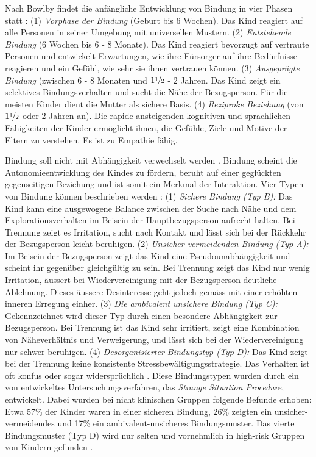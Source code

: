 Nach Bowlby findet die anfängliche Entwicklung von Bindung in vier Phasen statt \cite{Siegler2008}: (1) \textit{Vorphase der Bindung} (Geburt bis 6 Wochen). Das Kind reagiert auf alle Personen in seiner Umgebung mit universellen Mustern. (2) \textit{Entstehende Bindung} (6 Wochen bis 6 - 8 Monate). Das Kind reagiert bevorzugt auf vertraute Personen und entwickelt Erwartungen, wie ihre Fürsorger auf ihre Bedürfnisse reagieren und ein Gefühl, wie sehr sie ihnen vertrauen können. (3) \textit{Ausgeprägte Bindung} (zwischen 6 - 8 Monaten und $1\nicefrac{1}{2}$ - 2 Jahren. Das Kind zeigt ein selektives Bindungsverhalten und sucht die Nähe der Bezugsperson. Für die meisten Kinder dient die Mutter als sichere Basis. (4) \textit{Reziproke Beziehung} (von $1\nicefrac{1}{2}$ oder 2 Jahren an). Die rapide ansteigenden kognitiven und sprachlichen Fähigkeiten der Kinder ermöglicht ihnen, die Gefühle, Ziele und Motive der Eltern zu verstehen. Es ist zu Empathie fähig.

Bindung soll nicht mit Abhängigkeit verwechselt werden \cite{Schmidt1996}. Bindung scheint die Autonomieentwicklung des Kindes zu fördern, beruht auf einer geglückten gegenseitigen Beziehung und ist somit ein Merkmal der Interaktion. Vier Typen von Bindung können beschrieben werden \cite{Resch1999}: (1) \textit{Sichere Bindung (Typ B):} Das Kind kann eine ausgewogene Balance zwischen der Suche nach Nähe und dem Explorationsverhalten im Beisein der Hauptbezugsperson aufrecht halten. Bei Trennung zeigt es Irritation, sucht nach Kontakt und lässt sich bei der Rückkehr der Bezugsperson leicht beruhigen. (2) \textit{Unsicher vermeidenden Bindung (Typ A):} Im Beisein der Bezugsperson zeigt das Kind eine Pseudounabhängigkeit und scheint ihr gegenüber gleichgültig zu sein. Bei Trennung zeigt das Kind nur wenig Irritation, äussert bei Wiedervereinigung mit der Bezugsperson deutliche Ablehnung. Dieses äussere Desinteresse geht jedoch gemäss  mit einer erhöhten inneren Erregung einher. (3) \textit{Die ambivalent unsichere Bindung (Typ C):} Gekennzeichnet wird dieser Typ durch einen besondere Abhängigkeit zur Bezugsperson. Bei Trennung ist das Kind sehr irritiert, zeigt eine Kombination von Näheverhältnis und Verweigerung, und lässt sich bei der Wiedervereinigung nur schwer beruhigen. (4) \textit{Desorganisierter Bindungstyp (Typ D):} Das Kind zeigt bei der Trennung keine konsistente Stressbewältigungsstrategie. Das Verhalten ist oft konfus oder sogar widersprüchlich \cite{Siegler2008}. Diese Bindungstypen wurden durch ein von  entwickeltes Untersuchungsverfahren, das \textit{Strange Situation Procedure}, entwickelt. Dabei wurden bei nicht klinischen Gruppen folgende Befunde erhoben: Etwa 57\% der Kinder waren in einer sicheren Bindung, 26\% zeigten ein unsicher-vermeidendes und 17\% ein ambivalent-unsicheres Bindungsmuster. Das vierte Bindungsmuster (Typ D) wird nur selten und vornehmlich in high-risk Gruppen von Kindern gefunden \cite{Resch1999}.

